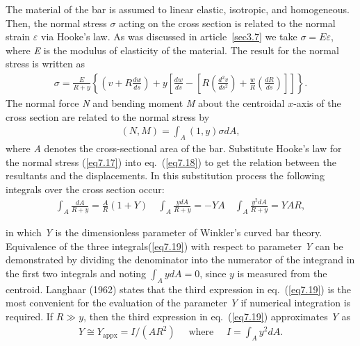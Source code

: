 \documentclass{AeroStructure-ERJohnson}
\begin{document}
The material of the bar is assumed to linear elastic, isotropic, and homogeneous. Then, the normal stress $\sigma$ acting on the cross section is related to the normal strain $\varepsilon$ via Hooke's law. As was discussed in article~\ref{sec3.7} we take $\sigma=E \varepsilon$, where \textit{E} is the modulus of elasticity of the material. The result for the normal stress is written as
\begin{align}\label{eq7.17}
\sigma=\frac{E}{R+y}\left\{\left(v+R \frac{d w}{d s}\right)+y\left[\frac{d w}{d s}-\left[R\left(\frac{d^{2} v}{d s^{2}}\right)+\frac{w}{R}\left(\frac{d R}{d s}\right)\right]\right]\right\}.
\end{align}
The normal force \textit{N} and bending moment \textit{M} about the centroidal $x$-axis of the cross section are related to the normal stress by\vspace*{-6pt}
\begin{align}\label{eq7.18}
(N, M)=\int_{A}(1, y) \sigma d A,
\end{align}
where \textit{A} denotes the cross-sectional area of the bar. Substitute Hooke's law for the normal stress (\ref{eq7.17}) into eq.~(\ref{eq7.18}) to get the relation between the resultants and the displacements. In this substitution process the following integrals over the cross section occur:
\begin{align}\label{eq7.19}
\int_{A} \frac{d A}{R+y}=\frac{A}{R}(1+Y) \quad \int_{A} \frac{y d A}{R+y}=-Y A \quad \int_{A} \frac{y^{2} d A}{R+y}=Y A R,
\end{align}
\vspace*{5pt}
\clearpage

\noindent in which \textit{Y} is the dimensionless parameter of Winkler's curved bar theory. Equivalence of the three integrals\break (\ref{eq7.19}) with respect to parameter \textit{Y} can be demonstrated by dividing the denominator into the numerator of the integrand in the first two integrals and noting $\int_A y d A=0$, since $y$ is measured from the centroid. Langhaar (1962) states that the third expression in eq.~(\ref{eq7.19}) is the most convenient for the evaluation of the parameter \textit{Y }if numerical integration is required. If $R \gg y$, then the third expression in eq.~(\ref{eq7.19}) approximates \textit{Y} as
\begin{align}\label{eq7.20}
Y \cong Y_{\mathrm{appx}}=I /\left(A R^{2}\right) \quad \text { where } \quad I=\int_{A} y^{2} d A.
\end{align}
\end{document}
